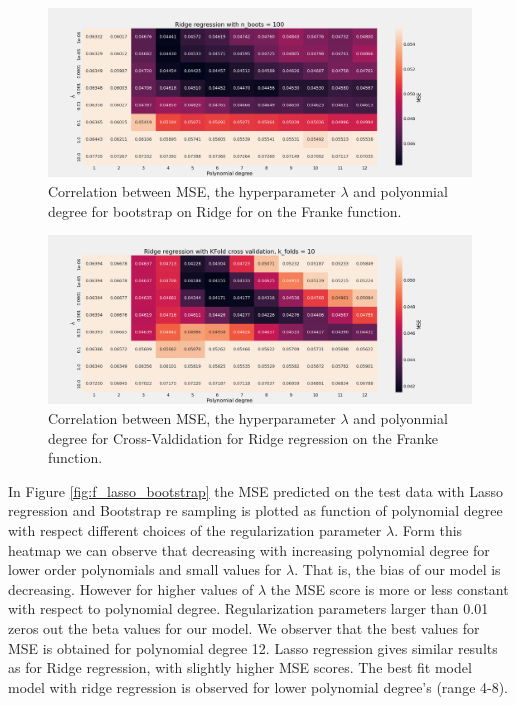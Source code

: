 \begin{figure}[H]
    \centering
    \includegraphics[width=1\textwidth]{Figures/e_ridge_n_boots_100.png}
    \caption{Correlation between MSE, the hyperparameter $\lambda$ and polyonmial degree for bootstrap on Ridge for on the Franke function.}  
    \label{fig:e_ridge} 
\end{figure}

\begin{figure}[H]
    \centering
    \includegraphics[width=\textwidth]{Figures/e_ridge_kfold_n_10.png}
    \caption{Correlation between MSE, the hyperparameter $\lambda$ and polyonmial degree for Cross-Valdidation for Ridge regression on the Franke function.}
    \label{fig:e_ridge_kfold}
\end{figure}




In Figure \ref{fig:f_lasso_bootstrap} the MSE predicted on the test data with
Lasso regression and Bootstrap re sampling is plotted as function of polynomial
degree with respect different choices of the regularization parameter $\lambda
$. Form this heatmap we can observe that decreasing with increasing polynomial
degree for lower order polynomials and small values for $\lambda $. That is,
the bias of our model is decreasing. However for higher values of $\lambda $
the MSE score is more or less constant with respect to polynomial degree.
Regularization parameters larger than 0.01 zeros out the beta values for our
model. We observer that the best values for MSE is obtained for polynomial
degree 12. Lasso regression gives similar results as for Ridge regression, with
slightly higher MSE scores. The best fit model model with ridge regression is
observed for lower polynomial degree's (range 4-8). 

